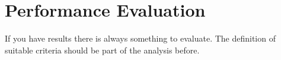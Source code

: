
\chapter{Performance Evaluation} 
\label{Chapter5} 

If you have results there is always something to evaluate.
The definition of suitable criteria should be part of the
analysis before.



